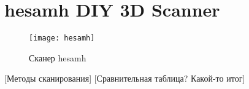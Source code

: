     \section{hesamh DIY 3D Scanner}
        \begin{figure}[!ht]
            \centering
            \texttt{[image: hesamh]}\label{pic:hesamh}
            \caption{Сканер hesamh}
        \end{figure}
    [Методы сканирования]
    [Сравнительная таблица? Какой-то итог]